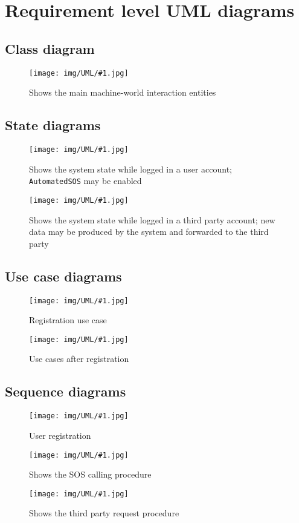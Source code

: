 \newcommand{\fetchUML}[4] {
  \begin{figure}[h!]
    \centering
    \hspace*{-#4cm}
    \texttt{[image: img/UML/\#1.jpg]}
    \caption{#2}
    \label{fig:#1}
  \end{figure}
}

\section{Requirement level UML diagrams}
\label{sec:graph}

  \subsection{Class diagram}
    \fetchUML
      {RequirementLevelClassDiagram}
      {Shows the main machine-world interaction entities}
      {1}           %
      {0}           %

  \clearpage
  \subsection{State diagrams}

    \fetchUML
      {UserStateDiagram}
      {Shows the system state while logged in a user account; \texttt{AutomatedSOS} may be enabled}
      {0.6}           %
      {0}           %

    \fetchUML
      {ThirdPartyStateDiagram}
      {Shows the system state while logged in a third party account; new data may be produced by the system and forwarded to the third party}
      {0.6}           %
      {0}           %

  \clearpage
  \subsection{Use case diagrams}

    \fetchUML
      {SignIn}
      {Registration use case}
      {.7}           %
      {0}           %

    \fetchUML
      {NormalBehaviour}
      {Use cases after registration}
      {1}           %
      {0}           %

  \clearpage
  \subsection{Sequence diagrams}

    \fetchUML
      {Seq_UserRegistration}
      {User registration}
      {.5}           %
      {0}           %

    \fetchUML
      {Seq_Ambulance}
      {Shows the SOS calling procedure}
      {.7}           %
      {0}           %

    \fetchUML
      {Seq_ThirdPartyRequest}
      {Shows the third party request procedure}
      {.7}           %
      {0}           %
